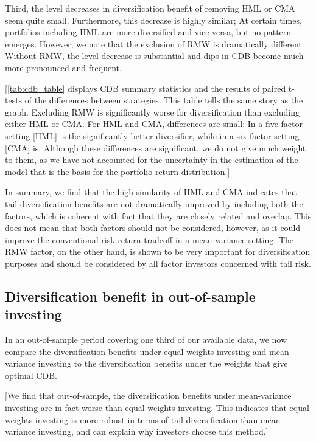 Third, the level decreases in diversification benefit of removing HML or CMA seem quite small. Furthermore, this decrease is highly similar; At certain times, portfolios including HML are more diversified and vice versa, but no pattern emerges. However, we note that the exclusion of RMW is dramatically different. Without RMW, the level decrease is substantial and dips in CDB become much more pronounced and frequent. 

[\autoref{tab:cdb_table} displays CDB summary statistics and the results of paired t-tests of the differences between strategies. This table tells the same story as the graph. Excluding RMW is significantly worse for diversification than excluding either HML or CMA. For HML and CMA, differences are small: In a five-factor setting [HML] is the significantly better diversifier, while in a six-factor setting [CMA] is. Although these differences are significant, we do not give much weight to them, as we have not accounted for the uncertainty in the estimation of the model that is the basis for the portfolio return distribution.]

In summary, we find that the high similarity of HML and CMA indicates that tail diversification benefits are not dramatically improved by including both the factors, which is coherent with fact that they are closely related and overlap. This does not mean that both factors should not be considered, however, as it could improve the conventional risk-return tradeoff in a mean-variance setting. The RMW factor, on the other hand, is shown to be very important for diversification purposes and should be considered by all factor investors concerned with tail risk.






\subsection{Diversification benefit in out-of-sample investing}

In an out-of-sample period covering one third of our available data, we now compare the diversification benefits under equal weights investing and mean-variance investing to the diversification benefits under the weights that give optimal CDB.

[We find that out-of-sample, the diversification benefits under mean-variance investing are in fact worse than equal weights investing. This indicates that equal weights investing is more robust in terms of tail diversification than mean-variance investing, and can explain why investors choose this method.]

